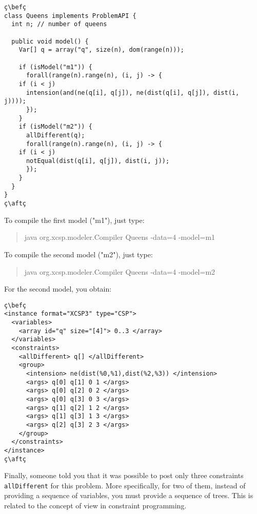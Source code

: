 \documentclass[10pt]{article}
\newcommand{\gb}[1]{{\tt #1}} %
\newenvironment{myvb}{\endgraf\small\verbatim}{\endverbatim}
\def\bef{\rule{10cm}{0.1mm}} %
\def\aft{\rule{10cm}{0.1mm}\medskip}
\begin{document}
\begin{lstlisting}
ç\befç
class Queens implements ProblemAPI {
  int n; // number of queens
  
  public void model() {
    Var[] q = array("q", size(n), dom(range(n)));
    
    if (isModel("m1")) {
      forall(range(n).range(n), (i, j) -> {
	if (i < j)
	  intension(and(ne(q[i], q[j]), ne(dist(q[i], q[j]), dist(i, j))));
      });
    }
    if (isModel("m2")) {
      allDifferent(q);
      forall(range(n).range(n), (i, j) -> {
	if (i < j)
	  notEqual(dist(q[i], q[j]), dist(i, j));
      });
    }
  }
}
ç\aftç
\end{lstlisting}

To compile the first model ("m1"), just type:
\begin{quote}
\begin{myvb}
java org.xcsp.modeler.Compiler Queens -data=4 -model=m1
\end{myvb}
\end{quote}


To compile the second model ("m2"), just type:
\begin{quote}
\begin{myvb}
java org.xcsp.modeler.Compiler Queens -data=4 -model=m2
\end{myvb}
\end{quote}

For the second model, you obtain:

\begin{lstlisting}
ç\befç
<instance format="XCSP3" type="CSP">
  <variables>
    <array id="q" size="[4]"> 0..3 </array>
  </variables>
  <constraints>
    <allDifferent> q[] </allDifferent>
    <group>
      <intension> ne(dist(%0,%1),dist(%2,%3)) </intension>
      <args> q[0] q[1] 0 1 </args>
      <args> q[0] q[2] 0 2 </args>
      <args> q[0] q[3] 0 3 </args>
      <args> q[1] q[2] 1 2 </args>
      <args> q[1] q[3] 1 3 </args>
      <args> q[2] q[3] 2 3 </args>
    </group>
  </constraints>
</instance>
ç\aftç
\end{lstlisting}

Finally, someone told you that it was possible to post only three constraints \gb{allDifferent} for this problem.
More specifically, for two of them, instead of providing a sequence of variables, you must provide a sequence of trees.
This is related to the concept of view in constraint programming.
\end{document}
